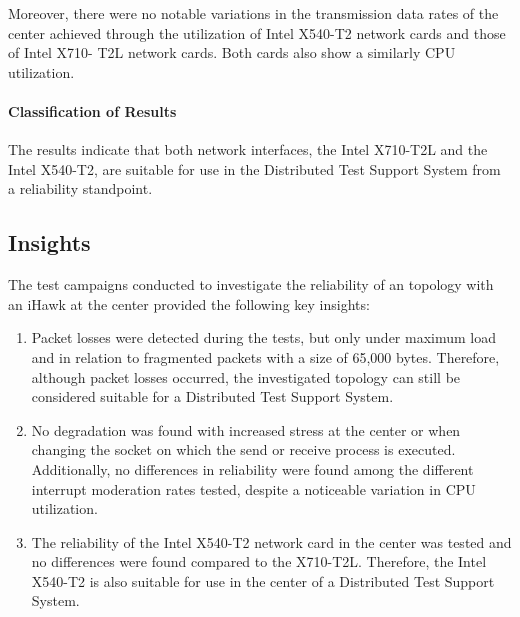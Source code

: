 Moreover, there were no notable variations in the transmission data rates of the center achieved through the utilization of Intel X540-T2 network cards and those of Intel X710- T2L network cards. Both cards also show a similarly \ac{CPU} utilization.

\paragraph{Classification of Results}
The results indicate that both network interfaces, the Intel X710-T2L and the Intel X540-T2, are suitable for use in the Distributed Test Support System from a reliability standpoint. 

\subsection{Insights} \label{insight:relHawk}
The test campaigns conducted to investigate the reliability of an topology with an iHawk at the center provided the following key insights:

\begin{enumerate}[label=(\roman*),resume]
    \item Packet losses were detected during the tests, but only under maximum load and in relation to fragmented packets with a size of 65,000 bytes. Therefore, although packet losses occurred, the investigated topology can still be considered suitable for a Distributed Test Support System. \label{insight:relHawk:1}
    \item No degradation was found with increased stress at the center or when changing the socket on which the send or receive process is executed. Additionally, no differences in reliability were found among the different interrupt moderation rates tested, despite a noticeable variation in \ac{CPU} utilization. \label{insight:relHawk:2}
    \item The reliability of the Intel X540-T2 network card in the center was tested and no differences were found compared to the X710-T2L. Therefore, the Intel X540-T2 is also suitable for use in the center of a Distributed Test Support System. \label{insight:relHawk:3}
\end{enumerate}














